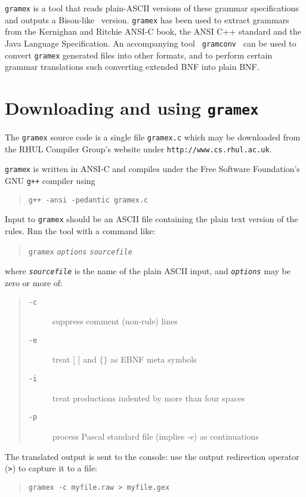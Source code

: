 \documentclass[11pt]{article}
\newcommand{\lp}{\tt\em}
\newcommand{\lt}{\tt}
\begin{document}
{\lt gramex} is a tool that reads plain-ASCII versions of these
grammar specifications and outputs a Bison-like~\cite{Bison}
version. {\tt gramex} has been used to extract grammars from the
Kernighan and Ritchie ANSI-C book, the ANSI C++ standard and the Java
Language Specification.  An accompanying tool {\lt
gramconv}~\cite{gramconv} can be used to convert {\lt gramex}
generated files into other formats, and to perform certain grammar
translations such converting extended BNF into plain BNF.

\section{Downloading and using {\tt gramex}}
The {\lt gramex} source code is a single file {\tt gramex.c} which may
be downloaded from the RHUL Compiler Group's website under
\verb+http://www.cs.rhul.ac.uk+.

{\lt gramex} is written in ANSI-C and compiles under the Free Software
Foundation's GNU {\lt g++} compiler using 
\begin{quote}
\verb|g++ -ansi -pedantic gramex.c|
\end{quote}

Input to {\tt gramex} should be an ASCII file containing the plain
text version of the rules. Run the tool with a command like:

\begin{quote}
{\lt gramex} {\lp options} {\lp sourcefile}
\end{quote}

where {\lp sourcefile} is the name of the plain ASCII input, and
{\lp options} may be zero or more of:
\begin{quote}
\begin{description}
\item[{\lt -c}]  suppress comment (non-rule) lines
\item[{\lt -e}]  treat [ ] and $\{ \}$ as EBNF meta symbols
\item[{\lt -i}]  treat productions indented by more than four spaces
\item[{\lt -p}]  process Pascal standard file (implies -e)
as continuations
\end{description}
\end{quote}

The translated output is sent to the console: use the output
redirection operator (\verb+>+) to capture it to a file:
\begin{quote}
\verb+gramex -c myfile.raw > myfile.gex+
\end{quote}
\end{document}
